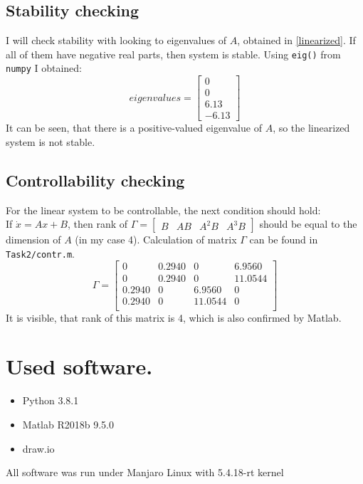 \documentclass[a4paper,12pt]{article}
\begin{document}
    \subsection{Stability checking}
    I will check stability with looking to eigenvalues of $A$, obtained in 
    \ref{linearized}. If all of them have negative real parts, then system is 
    stable. Using \texttt{eig()} from \texttt{numpy} I obtained:
    \begin{equation*}
        eigenvalues = 
        \begin{bmatrix}
            0\\
            0\\
            6.13\\
            -6.13
        \end{bmatrix}
    \end{equation*}
    It can be seen, that there is a positive-valued eigenvalue of $A$, so the 
    linearized system is not stable.
    \subsection{Controllability checking}
    For the linear system to be controllable, the next condition should hold:\\
    If $\dot x = Ax + B$, then rank of $\Gamma = 
    \begin{bmatrix}
        B & AB & A^2B & A^3B
    \end{bmatrix}$ should be equal to the dimension of $A$ (in my case 4).
    Calculation of matrix $\Gamma$ can be found in \texttt{Task2/contr.m}.
    \begin{equation}
        \Gamma = 
        \begin{bmatrix}
        0 & 0.2940 & 0 & 6.9560\\
        0 & 0.2940 & 0 & 11.0544\\
        0.2940 & 0 & 6.9560 & 0\\
        0.2940 & 0 & 11.0544 & 0\\
        \end{bmatrix}
    \end{equation}
    It is visible, that rank of this matrix is 4, which is also confirmed by Matlab.
\section{Used software.}
\begin{itemize}
    \item Python 3.8.1
    \item Matlab R2018b 9.5.0
    \item draw.io
\end{itemize}
All software was run under Manjaro Linux with 5.4.18-rt kernel
\end{document}
